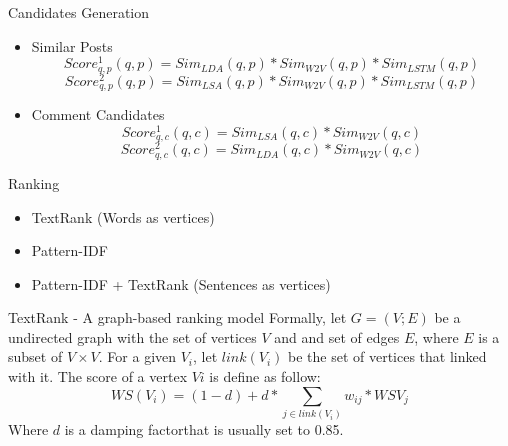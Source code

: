 \documentclass[aspectratio=169]{beamer} %
\begin{document}
    \begin{frame}{Candidates Generation}
      \begin{itemize}
      \item Similar Posts
      \begin{equation}
         Score_{q,p}^1(q, p) = Sim_{LDA}(q, p) * Sim_{W2V}(q, p) * Sim_{LSTM}(q, p)
      \end{equation}
      \begin{equation}
         Score_{q,p}^2(q, p) = Sim_{LSA}(q, p) * Sim_{W2V}(q, p) * Sim_{LSTM}(q, p)
      \end{equation}
      \item Comment Candidates
      \begin{equation}
         Score_{q,c}^1(q, c) = Sim_{LSA}(q, c) * Sim_{W2V}(q, c)
      \end{equation}
      \begin{equation}
         Score_{q,c}^2(q, c) = Sim_{LDA}(q, c) * Sim_{W2V}(q, c)
      \end{equation}
    \end{itemize}
    \end{frame}

    \begin{frame}{Ranking}
      \begin{itemize}
        \item TextRank (Words as vertices)
        \item Pattern-IDF
        \item Pattern-IDF + TextRank (Sentences as vertices)
      \end{itemize}
    \end{frame}

    \begin{frame}{TextRank - A graph-based ranking model}
      Formally, let $G = (V; E)$ be a undirected graph with the set of vertices 
      $V$ and and set of edges $E$, where $E$ is a subset of $V \times V$. For 
      a given $V_i$, let $link(V_i)$ be the set of vertices that linked with 
      it. The score of a vertex $Vi$ is define as follow:
      \begin{equation}
        WS(V_i) = (1 - d) + d * \sum_{j \in link(V_i)}{w_{ij} * WS{V_j}}
      \end{equation}
      Where $d$ is a damping factor\footnotemark that is usually set to 0.85.

    \end{frame}
\end{document}
